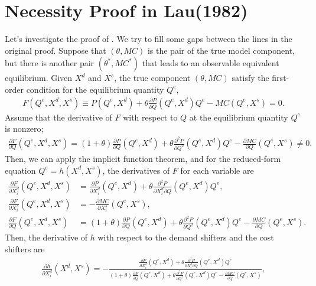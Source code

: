 \documentclass[11pt, a4paper]{article}
\theoremstyle{remark}
\begin{document}
\section{Necessity Proof in Lau(1982)}\label{sec:proof_lau_necessity}
Let's investigate the proof of \citet{lau1982identifying}.
We try to fill some gaps between the lines in the original proof.
Suppose that $(\theta, MC)$ is the pair of the true model component, but there is another pair $(\theta^{*}, MC^{*})$ that leads to an observable equivalent equilibrium.
Given $X^{d}$ and $X^{s}$, the true component $(\theta, MC)$ satisfy the first-order condition for the equilibrium quantity $Q^e$,
\begin{align}
    F(Q^e, X^{d}, X^{s}) \equiv P(Q^e, X^{d}) + \theta\frac{\partial P}{\partial Q}(Q^e, X^{d})Q^e - MC(Q^e, X^{s}) = 0.
\end{align}
Assume that the derivative of $F$ with respect to $Q$ at the equilibrium quantity $Q^e$ is nonzero;
\begin{align}
    \frac{\partial F}{\partial Q}(Q^e, X^{d}, X^{s}) = (1+\theta)\frac{\partial P}{\partial Q}(Q^e, X^{d}) + \theta\frac{\partial^2 P}{\partial Q^2}(Q^e, X^{d})Q^e - \frac{\partial MC}{\partial Q}(Q^e, X^{s}) \ne 0.
\end{align}
Then, we can apply the implicit function theorem, and for the reduced-form equation $Q^e = h(X^{d}, X^{s})$, the derivatives of $F$ for each variable are
\begin{align}
    \frac{\partial F}{\partial X^{d}_i}(Q^e, X^{d}, X^{s}) & =  \frac{\partial P}{\partial X^{d}_{i}}(Q^e, X^{d}) + \theta\frac{\partial^2 P}{\partial X^{d}_{i}\partial Q}(Q^e, X^{d})Q^e,\\
    \frac{\partial F}{\partial X^{s}_i}(Q^e, X^{d}, X^{s}) & =  -\frac{\partial MC}{\partial X^{s}_{i}}(Q^e, X^{s}),\\
    \frac{\partial F}{\partial Q}(Q^e, X^{d}, X^{s}) & = (1+\theta)\frac{\partial P}{\partial Q}(Q^e, X^{d}) + \theta\frac{\partial^2 P}{\partial Q^2}(Q^e, X^{d})Q^e - \frac{\partial MC}{\partial Q}(Q^e, X^{s}).
\end{align}
Then, the derivative of $h$ with respect to the demand shifters and the cost shifters are
\begin{align}
    \frac{\partial h}{\partial X^{d}_{i}}(X^{d}, X^{s}) = -\frac{\frac{\partial P}{\partial X^{d}_{i}}(Q^e, X^{d}) + \theta\frac{\partial^2 P}{\partial X^{d}_{i}\partial Q}(Q^e, X^{d})Q^e }{(1+\theta)\frac{\partial P}{\partial Q}(Q^e, X^{d}) + \theta\frac{\partial^2 P}{\partial Q^2}(Q^e, X^{d})Q^e - \frac{\partial MC}{\partial Q}(Q^e, X^{s})}, \label{eq:foc_derivative_demand}
\end{align}
\end{document}

